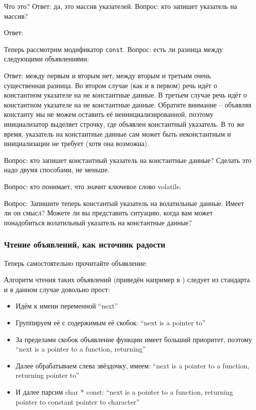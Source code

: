 \documentclass[a4paper,12pt,oneside]{article}
\begin{document}


Что это? Ответ: да, это массив указателей. Вопрос: кто запишет указатель на массив?

Ответ:



Теперь рассмотрим модификатор \lstinline!const!. Вопрос: есть ли разница между следующими объявлениями:



Ответ: между первым и вторым нет, между вторым и третьим очень существенная разница. Во втором случае (как и в первом) речь идёт о константном указателе на не константные данные. В третьем случае речь идёт о константном указателе на не константные данные. Обратите внимание -- объявляя константу мы не можем оставить её неинициализированной, поэтому инициализатор выделяет строчку, где объявлен константный указатель. В то же время, указатель на константные данные сам может быть неконстантным и инициализации не требует (хотя она возможна).

Вопрос: кто запишет константный указатель на константные данные? Сделать это надо двумя способами, не меньше.

Вопрос: кто понимает, что значит ключевое слово volatile.

Вопрос: Запишите теперь константый указатель на волатильные данные. Имеет ли он смысл? Можете ли вы представить ситуацию, когда вам может понадобиться волатильный указатель на константные данные?

\subsubsection{Чтение объявлений, как источник радости}

Теперь самостоятельно прочитайте объявление:



Алгоритм чтения таких объявлений (приведён например в \cite{linden}) следует из стандарта и в данном случае довольно прост:

\begin{itemize}
\item
Идём к имени переменной ``next''
\item
Группируем её с содержимым её скобок: ``next is a pointer to''
\item
За пределами скобок объявление функции имеет больший приоритет, поэтому ``next is a pointer to a function, returning''
\item
Далее обрабатываем слева звёздочку, имеем: ``next is a pointer to a function, returning pointer to''
\item
И далее парсим char * const: ``next is a pointer to a function, returning pointer to constant pointer to character''
\end{itemize}
\end{document}
